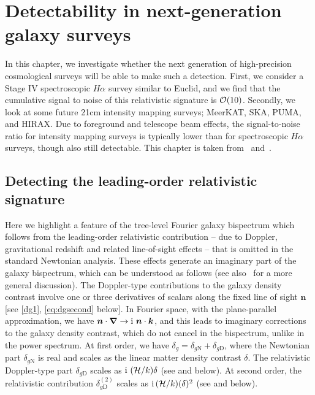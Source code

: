 
\chapter{Detectability in next-generation galaxy surveys}
\label{chapter:detect}


In this chapter, we investigate whether the next generation of high-precision cosmological surveys will be able to make such a detection. First, we consider a Stage IV spectroscopic $H\alpha$ survey similar to Euclid, and we find that the cumulative signal to noise of this relativistic signature  is $\mathcal{O}(10)$. Secondly, we look at some future 21cm intensity mapping surveys; MeerKAT, SKA, PUMA, and HIRAX. Due to foreground and telescope beam effects, the signal-to-noise ratio for intensity mapping surveys is typically lower than for spectroscopic $H\alpha$ surveys, though also still detectable. This chapter is taken from~\cite{Jolicoeur:2020eup} and~\cite{Maartens:2019yhx}.

\section{Detecting the leading-order relativistic signature}

Here we highlight a feature of the tree-level Fourier galaxy bispectrum which follows from the  leading-order relativistic contribution -- due to Doppler, gravitational redshift  and related line-of-sight effects -- that is omitted in the standard Newtonian analysis. These effects generate an imaginary part of the galaxy bispectrum, which can be understood as follows (see also~\cite{McDonald:2009dh,Clarkson:2018dwn,Jeong:2019igb} for a more general discussion).  
The Doppler-type contributions to the galaxy density contrast involve one or three derivatives  of scalars along the fixed line of sight $\bm n$ [see \eqref{dg1}, \eqref{eq:dgsecond} below]. In Fourier space, with the plane-parallel approximation, we have  $\bm{n}\cdot\bm{\nabla} \to {\mathrm{i\,}}\, \bm{n}\cdot\bm{k}$, and this leads to imaginary corrections to the galaxy density contrast, which do not cancel in the bispectrum, unlike in the power spectrum. At first order, we have $\delta_g=\delta_{g\mathrm{N}}+ \delta_{g\mathrm{D}}$, where the Newtonian part $\delta_{g\mathrm{N}}$ is real and scales as the linear matter density contrast $\delta$. The 
relativistic Doppler-type part $\delta_{g\mathrm{D}}$ scales as ${\mathrm{i\,}}\,(\mathcal{H}/k) \delta$  (see \cite{McDonald:2009dh, Jeong:2011as, Abramo:2017xnp,Clarkson:2018dwn} and below). At second  order, the relativistic contribution $\delta_{g\mathrm{D}}^{(2)}$ scales as ${\mathrm{i\,}}(\mathcal{H}/k) (\delta)^2$ (see \cite{Clarkson:2018dwn} and below). 


